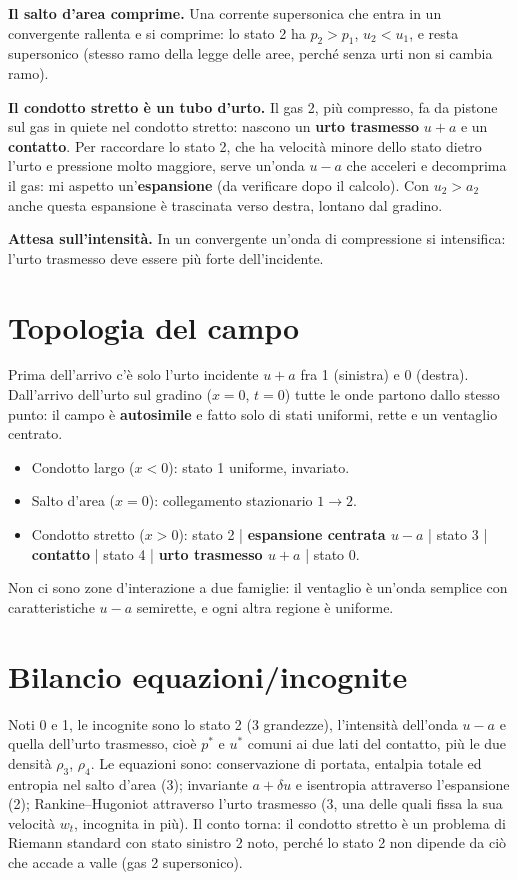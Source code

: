 \documentclass[11pt,a4paper]{article}
\newcommand{\uma}{u-a}
\newcommand{\upa}{u+a}
\begin{document}
\textbf{Il salto d'area comprime.} Una corrente supersonica che entra in un convergente rallenta e si comprime:
lo stato 2 ha $p_2>p_1$, $u_2<u_1$, e resta supersonico (stesso ramo della legge delle aree, perché senza urti
non si cambia ramo).

\textbf{Il condotto stretto è un tubo d'urto.} Il gas 2, più compresso, fa da pistone sul gas in quiete
nel condotto stretto: nascono un \textbf{urto trasmesso} $\upa$ e un \textbf{contatto}. Per raccordare lo stato 2,
che ha velocità minore dello stato dietro l'urto e pressione molto maggiore, serve un'onda $\uma$ che acceleri
e decomprima il gas: mi aspetto un'\textbf{espansione} (da verificare dopo il calcolo). Con $u_2>a_2$ anche
questa espansione è trascinata verso destra, lontano dal gradino.

\textbf{Attesa sull'intensità.} In un convergente un'onda di compressione si intensifica: l'urto trasmesso deve
essere più forte dell'incidente.

\section{Topologia del campo}\label{sec:topologia}
Prima dell'arrivo c'è solo l'urto incidente $\upa$ fra 1 (sinistra) e 0 (destra). Dall'arrivo dell'urto sul
gradino ($x=0$, $t=0$) tutte le onde partono dallo stesso punto: il campo è \textbf{autosimile} e fatto solo di
stati uniformi, rette e un ventaglio centrato.
\begin{itemize}
  \item Condotto largo ($x<0$): stato 1 uniforme, invariato.
  \item Salto d'area ($x=0$): collegamento stazionario $1\to2$.
  \item Condotto stretto ($x>0$): stato 2 | \textbf{espansione centrata $\uma$} | stato 3 | \textbf{contatto}
    | stato 4 | \textbf{urto trasmesso $\upa$} | stato 0.
\end{itemize}
Non ci sono zone d'interazione a due famiglie: il ventaglio è un'onda semplice con caratteristiche $\uma$
semirette, e ogni altra regione è uniforme.

\section{Bilancio equazioni/incognite}
Noti 0 e 1, le incognite sono lo stato 2 (3 grandezze), l'intensità dell'onda $\uma$ e quella dell'urto
trasmesso, cioè $p^*$ e $u^*$ comuni ai due lati del contatto, più le due densità $\rho_3$, $\rho_4$. Le equazioni
sono: conservazione di portata, entalpia totale ed entropia nel salto d'area (3); invariante $a+\delta u$ e
isentropia attraverso l'espansione (2); Rankine--Hugoniot attraverso l'urto trasmesso (3, una delle quali
fissa la sua velocità $w_t$, incognita in più). Il conto torna: il condotto stretto è un problema di Riemann
standard con stato sinistro 2 noto, perché lo stato 2 non dipende da ciò che accade a valle (gas 2 supersonico).
\end{document}
